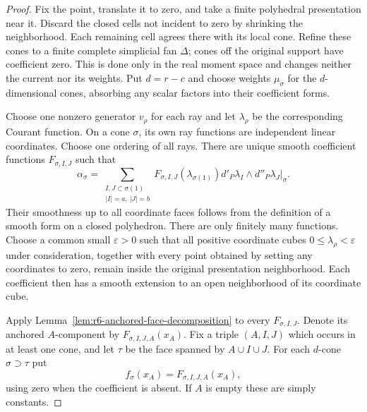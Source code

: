 \documentclass[11pt,a4paper]{article}
\numberwithin{equation}{section}
\theoremstyle{definition}
\theoremstyle{remark}
\begin{document}
\begin{proof}
Fix the point, translate it to zero, and take a finite polyhedral
presentation near it.  Discard the closed cells not incident to
zero by shrinking the neighborhood.  Each remaining cell agrees
there with its local cone.  Refine these cones to a finite
complete simplicial fan $\Delta$; cones off the original support
have coefficient zero.  This is done only in the real moment
space and changes neither the current nor its weights.  Put
$d=r-c$ and choose weights $\mu_\sigma$ for the $d$-dimensional
cones, absorbing any scalar factors into their coefficient forms.

Choose one nonzero generator $v_\rho$ for each ray and let
$\lambda_\rho$ be the corresponding Courant function.  On a
cone $\sigma$, its own ray functions are independent linear
coordinates.  Choose one ordering of all rays.  There are unique
smooth coefficient functions $F_{\sigma,I,J}$ such that
\[
       \alpha_\sigma
          =\sum_{\substack{I,J\subset\sigma(1)\\|I|=a,\ |J|=b}}
             F_{\sigma,I,J}(\lambda_{\sigma(1)})
                   d'_P\lambda_I\wedge d''_P\lambda_J\big|_\sigma.
\]
Their smoothness up to all coordinate faces follows from the
definition of a smooth form on a closed polyhedron.  There are
only finitely many functions.  Choose a common small
$\varepsilon>0$ such that all positive coordinate cubes
$0\leq\lambda_\rho<\varepsilon$ under consideration, together
with every point obtained by setting any coordinates to zero,
remain inside the original presentation neighborhood.  Each
coefficient then has a smooth extension to an open neighborhood
of its coordinate cube.

Apply Lemma~\ref{lem:r6-anchored-face-decomposition} to every
$F_{\sigma,I,J}$.  Denote its anchored $A$-component by
$F_{\sigma,I,J,A}(x_A)$.  Fix a triple $(A,I,J)$ which occurs
in at least one cone, and let $\tau$ be the face spanned by
$A\cup I\cup J$.  For each $d$-cone $\sigma\supset\tau$ put
\[
                         f_\sigma(x_A)=F_{\sigma,I,J,A}(x_A),
\]
using zero when the coefficient is absent.  If $A$ is empty
these are simply constants.


\end{proof}
\end{document}
